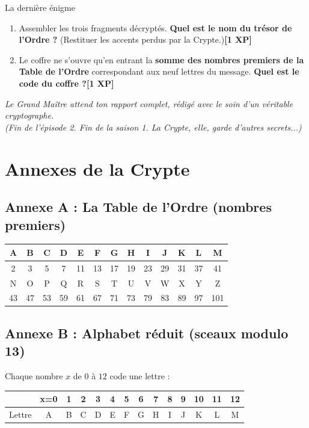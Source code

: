 \documentclass[11pt,a4paper]{article}
\newcommand{\Epx}[1]{\textcolor{or}{\textbf{[#1 XP]}}}
\begin{document}
	\begin{missive}{La dernière énigme}
		\begin{enumerate}[label=\textbf{E.\arabic*.},leftmargin=10mm]
			\item Assembler les trois fragments décryptés. \textbf{Quel est le nom du
				trésor de l'Ordre ?} (Restituer les accents perdus par la
			Crypte.)\Epx{1}
			\item Le coffre ne s'ouvre qu'en entrant la \textbf{somme des nombres
				premiers de la Table de l'Ordre} correspondant aux neuf lettres du
			message. \textbf{Quel est le code du coffre ?}\Epx{1}
		\end{enumerate}
	\end{missive}
	
	\vspace{2mm}
	\begin{center}
		\itshape Le Grand Maître attend ton rapport complet, rédigé avec le soin
		d'un véritable cryptographe.\\[2mm]
		(Fin de l'épisode 2. Fin de la saison 1. La Crypte, elle, garde
		d'autres secrets...)
	\end{center}
	
	\newpage
	\section*{Annexes de la Crypte}
	
	\subsection*{Annexe A : La Table de l'Ordre (nombres premiers)}
	\begin{center}
		\begin{tabular}{*{13}{c}}
			\toprule
			A & B & C & D & E & F & G & H & I & J & K & L & M\\
			\midrule
			2 & 3 & 5 & 7 & 11 & 13 & 17 & 19 & 23 & 29 & 31 & 37 & 41\\
			\midrule
			N & O & P & Q & R & S & T & U & V & W & X & Y & Z\\
			\midrule
			43 & 47 & 53 & 59 & 61 & 67 & 71 & 73 & 79 & 83 & 89 & 97 & 101\\
			\bottomrule
		\end{tabular}
	\end{center}
	
	\subsection*{Annexe B : Alphabet réduit (sceaux modulo 13)}
	Chaque nombre $x$ de $0$ à $12$ code une lettre :
	\begin{center}
		\begin{tabular}{l|*{13}{c}}
			& x=0 & 1 & 2 & 3 & 4 & 5 & 6 & 7 & 8 & 9 & 10 & 11 & 12\\
			\hline
			Lettre & A & B & C & D & E & F & G & H & I & J & K & L & M\\
		\end{tabular}
	\end{center}
	
\end{document}
